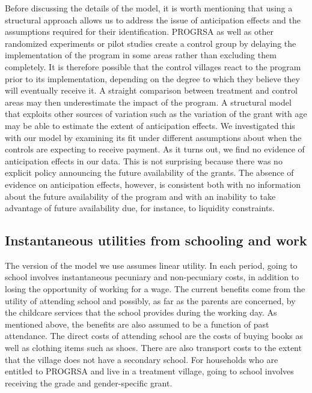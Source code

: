 \documentclass{handoutForSolutions}
\begin{document}
Before discussing the details of the model, it is worth mentioning that using a structural approach allows us to address the issue of anticipation effects and the assumptions required for their identification. PROGRSA as well as other randomized experiments or pilot studies create a control group by delaying the implementation of the program in some areas rather than excluding them completely. It is therefore possible that the control villages react to the program prior to its implementation, depending on the degree to which they believe they will eventually receive it. A straight comparison between treatment and control areas may then underestimate the impact of the program. A structural model that exploits other sources of variation such as the variation of the grant with age may be able to estimate the extent of anticipation effects. We investigated this with our model by examining its fit under different assumptions about when the controls are expecting to receive payment. As it turns out, we find no evidence of anticipation effects in our data. This is not surprising because there was no explicit policy announcing the future availability of the grants. The absence of evidence on anticipation effects, however, is consistent both with no information about the future availability of the program and with an inability to take advantage of future availability due, for instance, to liquidity constraints.


\subsection{Instantaneous utilities from schooling and work}
The version of the model we use assumes linear utility. In each period, going to school involves instantaneous pecuniary and non-pecuniary costs, in addition to losing the opportunity of working for a wage. The current benefits come from the utility of attending school and possibly, as far as the parents are concerned, by the childcare services that the school provides during the working day. As mentioned above, the benefits are also assumed to be a function of past attendance. The direct costs of attending school are the costs of buying books as well as clothing items such as shoes. There are also transport costs to the extent that the village does not have a secondary school. For households who are entitled to PROGRSA and live in a treatment village, going to school involves receiving the grade and gender-specific grant.
\end{document}
